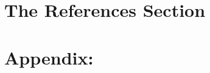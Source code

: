 \documentclass[runningheads,a4paper]{llncs}
\begin{document}

\section{The References Section}
\renewcommand\refname{}
\vspace*{-0.7cm}














\section*{Appendix:}
\scriptsize
\end{document}
